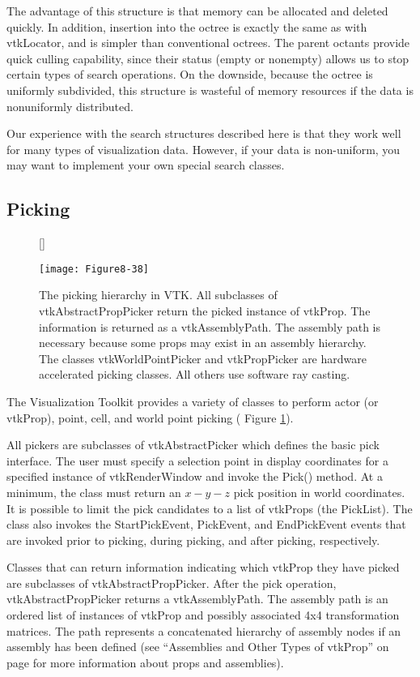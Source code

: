 The advantage of this structure is that memory can be allocated and deleted quickly. In addition, insertion into the octree is exactly the same as with vtkLocator, and is simpler than conventional octrees. The parent octants provide quick culling capability, since their status (empty or nonempty) allows us to stop certain types of search operations. On the downside, because the octree is uniformly subdivided, this structure is wasteful of memory resources if the data is nonuniformly distributed.

Our experience with the search structures described here is that they work well for many types of visualization data. However, if your data is non-uniform, you may want to implement your own special search classes.


\subsection{Picking}
\label{subsec:picking}

\begin{figure}[!htb]
	[\FBwidth]
	{\caption{The picking hierarchy in VTK. All subclasses of vtkAbstractPropPicker return the picked instance of vtkProp. The information is returned as a vtkAssemblyPath. The assembly path is necessary because some props may exist in an assembly hierarchy. The classes vtkWorldPointPicker and vtkPropPicker are hardware accelerated picking classes. All others use software ray casting.}\label{fig:Figure8-38}}
	{\texttt{[image: Figure8-38]}}
\end{figure}


The Visualization Toolkit provides a variety of classes to perform actor (or vtkProp), point, cell, and world point picking ( Figure \ref{fig:Figure8-38}).

All pickers are subclasses of vtkAbstractPicker which defines the basic pick interface. The user must specify a selection point in display coordinates for a specified instance of vtkRenderWindow and invoke the Pick() method. At a minimum, the class must return an $x-y-z$ pick position in world coordinates. It is possible to limit the pick candidates to a list of vtkProps (the PickList). The class also invokes the StartPickEvent, PickEvent, and EndPickEvent events that are invoked prior to picking, during picking, and after picking, respectively.

Classes that can return information indicating which vtkProp they have picked are subclasses of vtkAbstractPropPicker. After the pick operation, vtkAbstractPropPicker returns a vtkAssemblyPath. The assembly path is an ordered list of instances of vtkProp and possibly associated 4x4 transformation matrices. The path represents a concatenated hierarchy of assembly nodes if an assembly has been defined (see ``Assemblies and Other Types of vtkProp'' on page \pageref{subsubsec:assemblies_vtkprop} for more information about props and assemblies).

